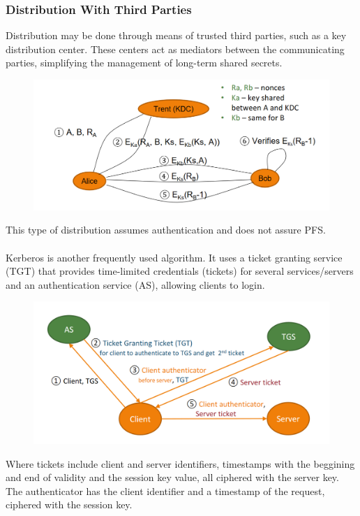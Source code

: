\documentclass[10pt,a4paper]{report}
\begin{document}
\subsubsection{Distribution With Third Parties}
Distribution may be done through means of trusted third parties, such as a key distribution center. These centers act as mediators between the communicating parties, simplifying the management of long-term shared secrets.
\begin{figure}[H]
\centering
\includegraphics[scale=0.40]{27.png}
\end{figure}
This type of distribution assumes authentication and does not assure PFS.\\
\\
Kerberos is another frequently used algorithm. It uses a ticket granting service (TGT) that provides time-limited credentials (tickets) for several services/servers and an authentication service (AS), allowing clients to login.
\begin{figure}[H]
\centering
\includegraphics[scale=0.40]{28.png}
\end{figure}
Where tickets include client and server identifiers, timestamps with the beggining and end of validity and the session key value, all ciphered with the server key.\\
The authenticator has the client identifier and a timestamp of the request, ciphered with the session key.
\end{document}
